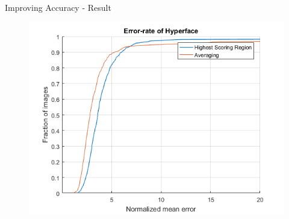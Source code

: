 \documentclass{beamer}
\begin{document}
\begin{frame}{Improving Accuracy - Result}

\begin{figure}
\centering
\includegraphics[scale=0.6]{fig/error_rate_mean_vs_highest}
\end{figure}
\end{frame}
\end{document}
